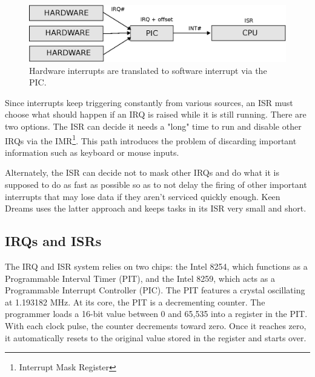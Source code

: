 \documentclass[book.tex]{subfiles}
\begin{document}
\par
\begin{figure}[H]
  \centering
  \includegraphics[width=\textwidth]{imgs/drawings/irqs/explanationsvg.eps}
  \caption{Hardware interrupts are translated to software interrupt via the PIC.}
\end{figure}

\par
 Since interrupts keep triggering constantly from various sources, an ISR must choose what should happen if an IRQ is raised while it is still running. There are two options.  The ISR can decide it needs a "long" time to run and disable other IRQs via the IMR\footnote{Interrupt Mask Register}. This path introduces the problem of discarding important information such as keyboard or mouse inputs.\\
 \par
 Alternately, the ISR can decide not to mask other IRQs and do what it is supposed to do as fast as possible so as to not delay the firing of other important interrupts that may lose data if they aren't serviced quickly enough. Keen Dreams uses the latter approach and keeps tasks in its ISR very small and short. 

\subsection{IRQs and ISRs}
The IRQ and ISR system relies on two chips: the Intel 8254, which functions as a Programmable Interval Timer (PIT), and the Intel 8259, which acts as a Programmable Interrupt Controller (PIC). The PIT features a crystal oscillating at 1.193182 MHz. At its core, the PIT is a decrementing counter. The programmer loads a 16-bit value between 0 and 65,535 into a register in the PIT. With each clock pulse, the counter decrements toward zero. Once it reaches zero, it automatically resets to the original value stored in the register and starts over.\\
\end{document}
